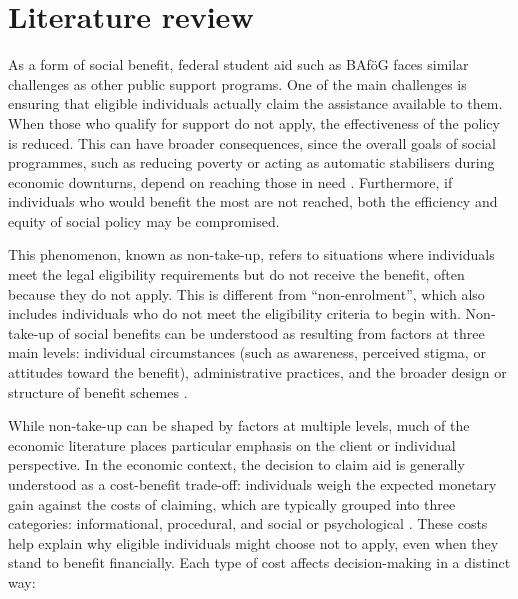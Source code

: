 \section{Literature review}
\label{section:literature_review}

As a form of social benefit, federal student aid such as BAföG faces similar challenges as other public support programs. 
One of the main challenges is ensuring that eligible individuals actually claim the assistance available to them. 
When those who qualify for support do not apply, the effectiveness of the policy is reduced. 
This can have broader consequences, since the overall goals of social programmes, such as reducing poverty or acting as automatic stabilisers during economic downturns, depend on reaching those in need \citep{goedeme_concept_2020}. 
Furthermore, if individuals who would benefit the most are not reached, both the efficiency and equity of social policy may be compromised.

This phenomenon, known as non-take-up, refers to situations where individuals meet the legal eligibility requirements but do not receive the benefit, often because they do not apply. 
This is different from “non-enrolment”, which also includes individuals who do not meet the eligibility criteria to begin with. Non-take-up of social benefits can be understood as resulting from factors at three main levels: individual circumstances (such as awareness, perceived stigma, or attitudes toward the benefit), administrative practices, and the broader design or structure of benefit schemes \citep{vanoorschot_failing_2002}. 

While non-take-up can be shaped by factors at multiple levels, much of the economic literature places particular emphasis on the client or individual perspective. In the economic context, the decision to claim aid is generally understood as a cost-benefit trade-off: individuals weigh the expected monetary gain against the costs of claiming, which are typically grouped into three categories: informational, procedural, and social or psychological \citep{booij_role_2012}. 
These costs help explain why eligible individuals might choose not to apply, even when they stand to benefit financially. 
Each type of cost affects decision-making in a distinct way:

